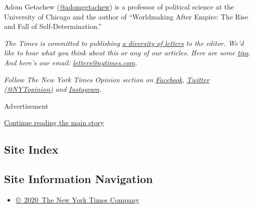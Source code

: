 Adom Getachew (\href{https://twitter.com/adomgetachew}{@adomgetachew})
is a professor of political science at the University of Chicago and the
author of ``Worldmaking After Empire: The Rise and Fall of
Self-Determination.''

\emph{The Times is committed to publishing}
\href{https://www.nytimes.com/2019/01/31/opinion/letters/letters-to-editor-new-york-times-women.html}{\emph{a
diversity of letters}} \emph{to the editor. We'd like to hear what you
think about this or any of our articles. Here are some}
\href{https://help.nytimes.com/hc/en-us/articles/115014925288-How-to-submit-a-letter-to-the-editor}{\emph{tips}}\emph{.
And here's our email:}
\href{mailto:letters@nytimes.com}{\emph{letters@nytimes.com}}\emph{.}

\emph{Follow The New York Times Opinion section on}
\href{https://www.facebook.com/nytopinion}{\emph{Facebook}}\emph{,}
\href{http://twitter.com/NYTOpinion}{\emph{Twitter (@NYTopinion)}}
\emph{and}
\href{https://www.instagram.com/nytopinion/}{\emph{Instagram}}\emph{.}

Advertisement

\protect\hyperlink{after-bottom}{Continue reading the main story}

\hypertarget{site-index}{%
\subsection{Site Index}\label{site-index}}

\hypertarget{site-information-navigation}{%
\subsection{Site Information
Navigation}\label{site-information-navigation}}

\begin{itemize}
\tightlist
\item
  \href{https://help.nytimes.com/hc/en-us/articles/115014792127-Copyright-notice}{©~2020~The
  New York Times Company}
\end{itemize}

